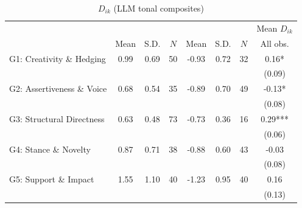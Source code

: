 \begin{table}
    \footnotesize
    \centering
    \begin{threeparttable}
        \caption{\(D_{ik}\) (LLM tonal composites)}
        \label{table8llm_base}
        \begin{tabular}{p{3cm}S[table-format=3.3]@{}S[table-format=3.3]@{}S[table-format=3.2]@{}S[table-format=4.3]@{}S[table-format=3.3]@{}S[table-format=3.1]@{}S@{}}
            \toprule
            &&&{{Mean \(D_{ik}\)}}\\\cmidrule(lr){2-4}\cmidrule(lr){5-7}\cmidrule(lr){8-8}&{{Mean}}&{{S.D.}}&{{\(N\)}}&{{Mean}}&{{S.D.}}&{{\(N\)}}&{{All obs.}}\\
            \midrule
            G1: Creativity \& Hedging     &        0.99&        0.69&          50&       -0.93&        0.72&          32&        0.16*  \\
                                          &            &            &            &            &            &            &      (0.09)   \\
            G2: Assertiveness \& Voice    &        0.68&        0.54&          35&       -0.89&        0.70&          49&       -0.13*  \\
                                          &            &            &            &            &            &            &      (0.08)   \\
            G3: Structural Directness     &        0.63&        0.48&          73&       -0.73&        0.36&          16&        0.29***\\
                                          &            &            &            &            &            &            &      (0.06)   \\
            G4: Stance \& Novelty         &        0.87&        0.71&          38&       -0.88&        0.60&          43&       -0.03   \\
                                          &            &            &            &            &            &            &      (0.08)   \\
            G5: Support \& Impact         &        1.55&        1.10&          40&       -1.23&        0.95&          40&        0.16   \\
                                          &            &            &            &            &            &            &      (0.13)   \\

\end{tabular}
\end{threeparttable}
\end{table}
